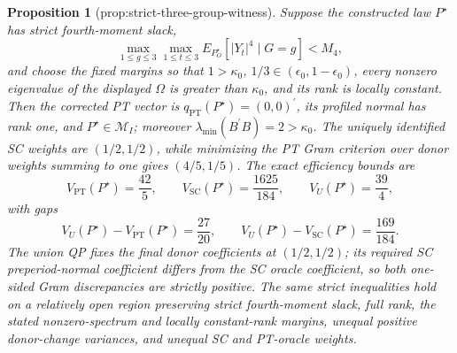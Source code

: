 \documentclass{article}
\newtheorem{proposition}{Proposition}
\begin{document}
\begin{proposition}[prop:strict-three-group-witness]\label{prop:strict-three-group-witness}
Suppose the constructed law \(P^{\star}\) has strict fourth-moment slack, \[\max_{1\le g\le3}\max_{1\le t\le3}E_{P_O^{\star}}[|Y_t|^4\mid G=g]<M_4,\] and choose the fixed margins so that \(1>\kappa_0\), \(1/3\in(\epsilon_0,1-\epsilon_0)\), every nonzero eigenvalue of the displayed \(\Omega\) is greater than \(\kappa_0\), and its rank is locally constant. Then the corrected PT vector is \(q_{\mathrm{PT}}(P^{\star})=(0,0)^{\prime}\), its profiled normal has rank one, and \(P^{\star}\in\mathcal M_I\); moreover \(\lambda_{\min}(B^{\prime}B)=2>\kappa_0\). The uniquely identified SC weights are \((1/2,1/2)\), while minimizing the PT Gram criterion over donor weights summing to one gives \((4/5,1/5)\). The exact efficiency bounds are \[V_{\mathrm{PT}}(P^{\star})=\frac{42}{5},\qquad V_{\mathrm{SC}}(P^{\star})=\frac{1625}{184},\qquad V_U(P^{\star})=\frac{39}{4},\] with gaps \[V_U(P^{\star})-V_{\mathrm{PT}}(P^{\star})=\frac{27}{20},\qquad V_U(P^{\star})-V_{\mathrm{SC}}(P^{\star})=\frac{169}{184}.\] The union QP fixes the final donor coefficients at \((1/2,1/2)\); its required SC preperiod-normal coefficient differs from the SC oracle coefficient, so both one-sided Gram discrepancies are strictly positive. The same strict inequalities hold on a relatively open region preserving strict fourth-moment slack, full rank, the stated nonzero-spectrum and locally constant-rank margins, unequal positive donor-change variances, and unequal SC and PT-oracle weights.
\end{proposition}
\end{document}
